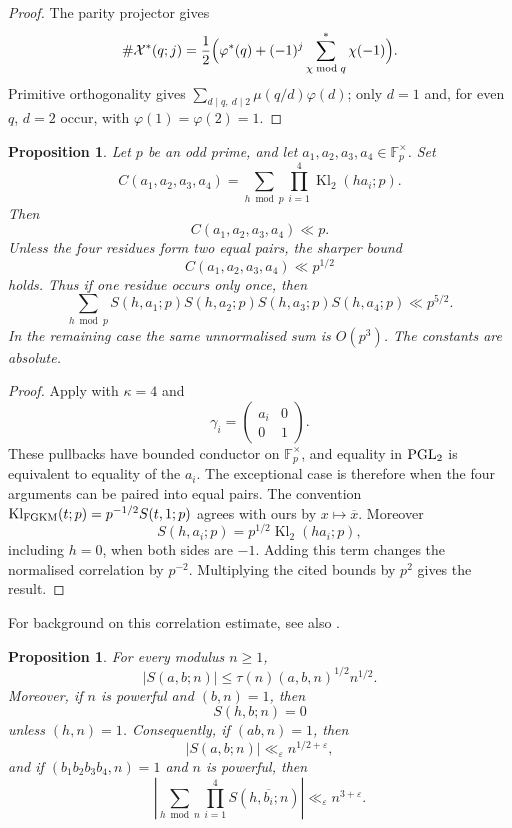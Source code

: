 \documentclass[12pt, a4paper]{amsart}
\numberwithin{equation}{section}
\newcommand{\ep}{\varepsilon}
\newcommand{\F}{\mathbb{F}}
\renewcommand{\bar}[1]{\overline{#1}}
\renewcommand{\le}{\leqslant}
\renewcommand{\ge}{\geqslant}
\theoremstyle{plain}
\newtheorem{prop}[lem]{Proposition}
\begin{document}
\begin{proof}
The parity projector gives
$$
\#\mathcal X^*(q;j)=\frac12\Bigl(\varphi^*(q)+(-1)^j\sum_{\chi\bmod q}^{*}\chi(-1)\Bigr).
$$
Primitive orthogonality gives $\sum_{d\mid q,\ d\mid 2}\mu(q/d)\varphi(d)$; only $d=1$ and, for even $q$, $d=2$ occur, with $\varphi(1)=\varphi(2)=1$.
\end{proof}

\begin{prop}\label{prop:fgkm-prime-local}
Let $p$ be an odd prime, and let $a_1,a_2,a_3,a_4\in\F_p^\times$. Set
$$
C(a_1,a_2,a_3,a_4)=
\sum_{h\bmod p}
\prod_{i=1}^4 \operatorname{Kl}_2(ha_i;p).
$$
Then
$$
C(a_1,a_2,a_3,a_4)\ll p.
$$
Unless the four residues form two equal pairs, the sharper bound
$$
C(a_1,a_2,a_3,a_4)\ll p^{1/2}
$$
holds. Thus if one residue occurs only once, then
$$
\sum_{h\bmod p}
S(h,a_1;p)S(h,a_2;p)S(h,a_3;p)S(h,a_4;p)
\ll p^{5/2}.
$$
In the remaining case the same unnormalised sum is $O(p^3)$. The constants are absolute.
\end{prop}

\begin{proof}
Apply \cite[Proposition 3.2]{FGKM} with $\kappa=4$ and
$$
\gamma_i=\begin{pmatrix}a_i&0\\0&1\end{pmatrix}.
$$
These pullbacks have bounded conductor on $\F_p^\times$, and equality in ${\rm PGL}_2$ is equivalent to equality of the $a_i$. The exceptional case is therefore when the four arguments can be paired into equal pairs. The convention $\operatorname{Kl}_{\rm FGKM}(t;p)=p^{-1/2}S(t,1;p)$ agrees with ours by $x\mapsto\bar x$. Moreover
$$
S(h,a_i;p)=p^{1/2}\operatorname{Kl}_2(ha_i;p),
$$
including $h=0$, when both sides are $-1$. Adding this term changes the normalised correlation by $p^{-2}$. Multiplying the cited bounds by $p^2$ gives the result.
\end{proof}

For background on this correlation estimate, see also \cite[Theorem~13.3]{FKMS}.

\begin{prop}\label{prop:weil-estermann}
For every modulus $n\ge1$,
$$
|S(a,b;n)|\le \tau(n)(a,b,n)^{1/2}n^{1/2}.
$$
Moreover, if $n$ is powerful and $(b,n)=1$, then
$$
S(h,b;n)=0
$$
unless $(h,n)=1$. Consequently, if $(ab,n)=1$, then
$$
|S(a,b;n)|\ll_\ep n^{1/2+\ep},
$$
and if $(b_1b_2b_3b_4,n)=1$ and $n$ is powerful, then
$$
\left|
\sum_{h\bmod n}\prod_{i=1}^4 S(h,\overline{b_i};n)
\right|
\ll_\ep n^{3+\ep}.
$$
\end{prop}
\end{document}
